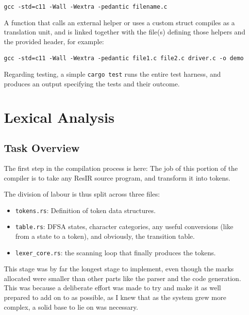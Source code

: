 \documentclass[11pt,a4paper,oneside]{report}
\begin{document}
	\begin{center}
		\texttt{gcc -std=c11 -Wall -Wextra -pedantic filename.c}
	\end{center}
	
	A function that calls an external helper or uses a custom struct compiles as a
	translation unit, and is linked together with the file(s) defining those
	helpers and the provided header, for example:
	
	\begin{center}
		\texttt{gcc -std=c11 -Wall -Wextra -pedantic file1.c file2.c driver.c -o demo}
	\end{center}
	
	Regarding testing, a simple \texttt{cargo test} runs the entire test harness, and produces an output specifying the tests and their outcome. 
	
	
	
	
	\chapter{Lexical Analysis}
	
	
	\section{Task Overview}
	The first step in the compilation process is here: The job of this portion of the compiler is to take any ResIR source program, and transform it into tokens. 
	
	The division of labour is thus split across three files:
	
	\begin{itemize}
		\item \texttt{tokens.rs}: Definition of token data structures. 
		\item \texttt{table.rs}: DFSA states, character categories, any useful conversions (like from a state to a token), and obviously, the transition table.
		\item \texttt{lexer\_core.rs}: the scanning loop that finally produces the tokens.
	\end{itemize}
	
	This stage was by far the longest stage to implement, even though the marks allocated were smaller than other parts like the parser and the code generation. This was because a deliberate effort was made to try and make it as well prepared to add on to as possible, as I knew that as the system grew more complex, a solid base to lie on was necessary.
	
\end{document}
